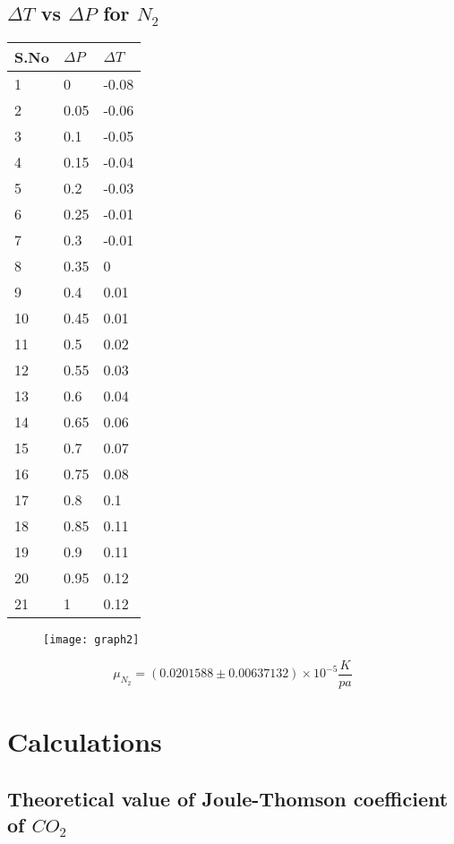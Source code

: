 \documentclass[
	letterpaper, %
	10pt, %
]{CSUniSchoolLabReport}
\begin{document}
\subsection{\(\Delta T\) vs \(\Delta P\) for \(N_2\)   }
\begin{center}
	\begin{tabular}{ | m{1cm} | m{3cm}| m{3cm} | } 
		\hline
		S.No	&	\(\Delta P\)	&	\(\Delta T\) \\
		\hline
		1&0&-0.08\\
		2&0.05&-0.06\\
		3&0.1&-0.05\\
		4&0.15&-0.04\\
		5&0.2&-0.03\\
		6&0.25&-0.01\\
		7&0.3&-0.01\\
		8&0.35&0\\
		9&0.4&0.01\\
		10&0.45&0.01\\
		11&0.5&0.02\\
		12&0.55&0.03\\
		13&0.6&0.04\\
		14&0.65&0.06\\
		15&0.7&0.07\\
		16&0.75&0.08\\
		17&0.8&0.1\\
		18&0.85&0.11\\
		19&0.9&0.11\\
		20&0.95&0.12\\
		21&1&0.12\\
		\hline
	\end{tabular}
\end{center}
\begin{figure}[H] %
	\centering %
	\texttt{[image: graph2]} %
	\caption{}
\end{figure}
\[
	\boxed{\mu_{N_2} = (0.0201588 \pm 0.00637132 ) \times 10^{-5} \frac{K}{pa}}
\]
\section{Calculations}
\subsection{Theoretical value of Joule-Thomson coefficient of  \(CO_{2}\)}
\end{document}
